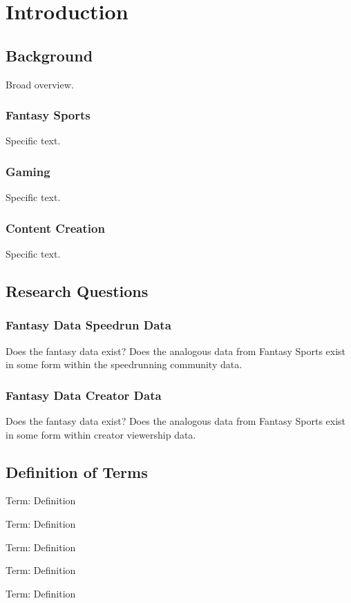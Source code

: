 \chapter{Introduction}

\section{Background}
Broad overview.

\subsection{Fantasy Sports}
Specific text.

\subsection{Gaming}
Specific text.

\subsection{Content Creation}
Specific text.

\section{Research Questions}

\subsection{Fantasy Data Speedrun Data}
Does the fantasy data exist?  Does the analogous data from Fantasy Sports exist in some form within the speedrunning community data.

\subsection{Fantasy Data Creator Data}
Does the fantasy data exist?  Does the analogous data from Fantasy Sports exist in some form within creator viewership data.

\section{Definition of Terms}
\par Term: Definition
\par Term: Definition
\par Term: Definition
\par Term: Definition
\par Term: Definition


